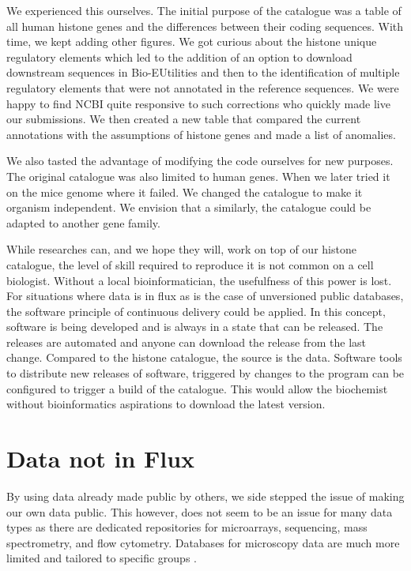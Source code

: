We experienced this ourselves.  The initial purpose of the catalogue
was a table of all human histone genes and the differences between
their coding sequences.  With time, we kept adding other figures.
We got curious about the histone unique regulatory elements which
led to the addition of an option to download downstream sequences in
Bio-EUtilities and then to the identification of multiple regulatory
elements that were not annotated in the reference sequences.  We were
happy to find NCBI quite responsive to such corrections who quickly
made live our submissions.  We then created a new table that compared
the current annotations with the assumptions of histone genes and
made a list of anomalies.

We also tasted the advantage of modifying the code ourselves for new
purposes.  The original catalogue was also limited to human genes.
When we later tried it on the mice genome where it failed.  We changed
the catalogue to make it organism independent.  We envision that a
similarly, the catalogue could be adapted to another gene family.

While researches can, and we hope they will, work on top of our
histone catalogue, the level of skill required to reproduce it is not
common on a cell biologist.  Without a local bioinformatician, the
usefulfness of this power is lost.  For situations where data is in
flux as is the case of unversioned public databases, the software
principle of continuous delivery could be applied.  In this concept,
software is being developed and is always in a state that can be
released.  The releases are automated and anyone can download the
release from the last change.  Compared to the histone catalogue, the
source is the data.  Software tools to distribute new releases of
software, triggered by changes to the program can be configured to
trigger a build of the catalogue.  This would allow the biochemist
without bioinformatics aspirations to download the latest version.

\section{Data not in Flux}

By using data already made public by others, we side stepped the issue
of making our own data public.  This however, does not seem to be an
issue for many data types as there are dedicated repositories for
microarrays, sequencing, mass spectrometry, and flow cytometry.
Databases for microscopy data are much more limited and tailored to
specific groups .


